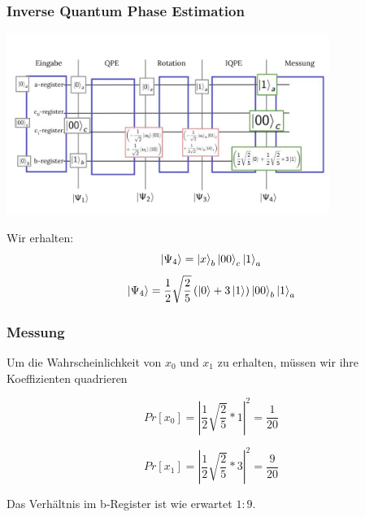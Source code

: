 \begin{frame}
    \frametitle{Inverse Quantum Phase Estimation}
    \begin{center}
    \includegraphics[width=10.5cm]{img/example_circuit/example_circuit_4.jpg}
    \end{center}

Wir erhalten:
$$\ket{\Psi_4}= \ket{x}_b \ket{00}_c \ket{1}_a $$
$$ \ket{\Psi_4}=\frac{1}{2}\sqrt{\frac{2}{5}}  \left(\ket{0} +3 \ket{1} \right) \ket{00}_b \ket{1}_a$$
\end{frame}


\begin{frame}
    \frametitle{Messung}

Um die Wahrscheinlichkeit von $x_0$ und $x_1$ zu erhalten, müssen wir ihre Koeffizienten quadrieren

$$ Pr[x_0]=\left|\frac{1}{2}\sqrt{\frac{2}{5}}*1\right|^2 = \frac{1}{20} $$

$$ Pr[x_1]=\left|\frac{1}{2}\sqrt{\frac{2}{5}}*3\right|^2 = \frac{9}{20} $$

Das Verhältnis im b-Register ist wie erwartet $1:9$.

\end{frame}






